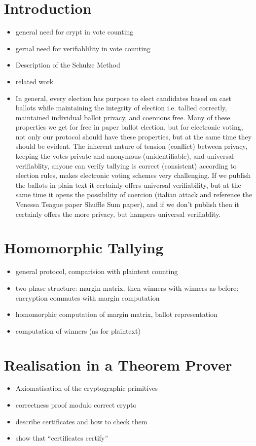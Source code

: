\documentclass{llncs}
\begin{document}
\section{Introduction}
\begin{itemize}
  \item general need for crypt in vote counting
  \item gernal need for verifiablility in vote counting
  \item Description of the Schulze Method 
  \item related work
  \item In general, every election has purpose to elect candidates based on cast
  ballots while maintaining the integrity of election i.e. tallied correctly, 
  maintained individual ballot privacy, and coercions free. Many of these properties 
  we get for free in paper ballot election, but for electronic voting, not only 
  our protocol should have these properties, but at the same time they should be 
  evident. The inherent nature of tension (conflict) between privacy, keeping the votes 
  private and anonymous (unidentifiable), and universal verifiablity, anyone can verify
  tallying is correct (consistent) according to election rules, makes electronic 
  voting schemes very challenging. If we publish 
  the ballots in plain text it certainly offers universal verifiability, but at the same
  time it opens the possibility of coercion (italian attack and reference the 
  Venessa Teague paper Shuffle Sum paper), and if we don't publish then it certainly
  offers the more privacy, but hampers universal verifiablity.    
  
\end{itemize}

\section{Homomorphic Tallying}
\begin{itemize}
  \item general protocol, comparision with plaintext counting
  \item two-phase structure: margin matrix, then winners with
  winners as before: encryption commutes with margin computation
  \item homomorphic computation of margin matrix, ballot
  representation
  \item computation of winners (as for plaintext)
\end{itemize}

\section{Realisation in a Theorem Prover}
\begin{itemize}
  \item Axiomatisation of the cryptographic primitives
  \item correctness proof modulo correct crypto
  \item describe certificates and how to check them
  \item show that ``certificates certify''
\end{itemize}
\end{document}
